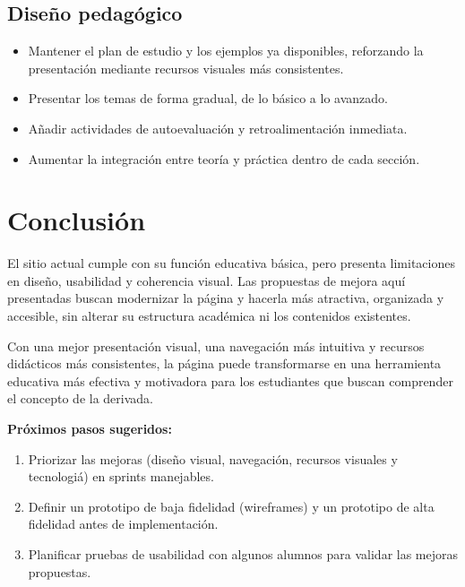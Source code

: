 \documentclass[11pt,a4paper]{article}
\begin{document}
\subsection{Dise\~no pedag\'ogico}
\begin{itemize}[left=0pt,labelsep=5pt]
    \item Mantener el plan de estudio y los ejemplos ya disponibles, reforzando la presentaci\'on mediante recursos visuales m\'as consistentes.
    \item Presentar los temas de forma gradual, de lo b\'asico a lo avanzado.
    \item A\~nadir actividades de autoevaluaci\'on y retroalimentaci\'on inmediata.
    \item Aumentar la integraci\'on entre teor\'ia y pr\'actica dentro de cada secci\'on.
\end{itemize}

\section{Conclusi\'on}
El sitio actual cumple con su funci\'on educativa b\'asica, pero presenta limitaciones en dise\~no, usabilidad y coherencia visual. Las propuestas de mejora aqu\'i presentadas buscan modernizar la p\'agina y hacerla m\'as atractiva, organizada y accesible, sin alterar su estructura acad\'emica ni los contenidos existentes.

Con una mejor presentaci\'on visual, una navegaci\'on m\'as intuitiva y recursos did\'acticos m\'as consistentes, la p\'agina puede transformarse en una herramienta educativa m\'as efectiva y motivadora para los estudiantes que buscan comprender el concepto de la derivada.

\vspace{1em}
\noindent
\textbf{Pr\'oximos pasos sugeridos:}
\begin{enumerate}[left=0pt]
    \item Priorizar las mejoras (dise\~no visual, navegaci\'on, recursos visuales y tecnologi\'a) en sprints manejables.
    \item Definir un prototipo de baja fidelidad (wireframes) y un prototipo de alta fidelidad antes de implementaci\'on.
    \item Planificar pruebas de usabilidad con algunos alumnos para validar las mejoras propuestas.
\end{enumerate}

\vspace{2em}

\noindent
\end{document}
